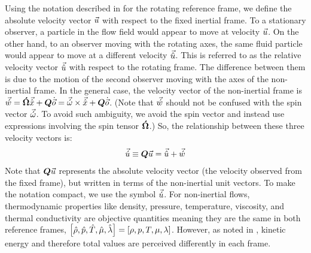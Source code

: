 Using the notation described in 
for the rotating reference frame,
we define the absolute velocity vector $\vec{{{{u}}}}$
with respect to the fixed inertial frame.
%
To a stationary observer, a particle in the flow field would appear to
move at velocity $\vec{{{{u}}}}$.
%
On the other hand, to an observer moving with the rotating axes, the same
fluid particle would appear to move at a different velocity $\vec{{{{\hat{u}}}}}$.
%
This is referred to as the relative velocity vector $\vec{{{{\hat{u}}}}}$
with respect to the rotating frame.
%
The difference between them is due to the motion of the second observer
moving with the axes of the non-inertial frame.
%
In the general case, the velocity vector of the non-inertial frame is
$\vec{{{{\acute{w}}}}} = {\bm{{{{\acute{\Omega}}}}}} \vec{{{{\hat{x}}}}}
                    + {\bm{{{{Q}}}}} {\dot{\vec{{{{o}}}}}}
                    = \vec{{{{\acute{\omega}}}}} \times \vec{{{{\hat{x}}}}}
                    + {\bm{{{{Q}}}}} {\dot{\vec{{{{o}}}}}}
$.
%
(Note that $\vec{{{{\acute{w}}}}}$ should not be confused with
the spin vector $\vec{{{{\acute{\omega}}}}}$.
To avoid such ambiguity, we avoid the spin vector and instead use expressions
involving the spin tensor ${\bm{{{{\acute{\Omega}}}}}}$.)
%
So, the relationship between these three velocity vectors is:
\begin{gather}
  \vec{{{{\acute{u}}}}} \equiv {\bm{{{{Q}}}}} \vec{{{{u}}}} = \vec{{{{\hat{u}}}}} + \vec{{{{\acute{w}}}}}
\end{gather}
%
Note that ${\bm{{{{Q}}}}} \vec{{{{u}}}}$ represents the absolute velocity vector
(\thatis the velocity observed from the fixed frame),
but written in terms of the non-inertial unit vectors.
%
To make the notation compact, we use the symbol $\vec{{{{\acute{u}}}}}$.
%
For non-inertial flows, thermodynamic properties like density, pressure,
temperature, viscosity, and thermal conductivity are objective quantities
meaning they are the same in both reference frames, \thatis
$\left[{\hat{\rho}},{\hat{p}},{\hat{T}},{\hat{\mu}},{\hat{\lambda}}\right] = 
\left[\rho,p,T,\mu,\lambda\right]$.
%
However, as noted in , kinetic energy and therefore
total values are perceived differently in each frame.


